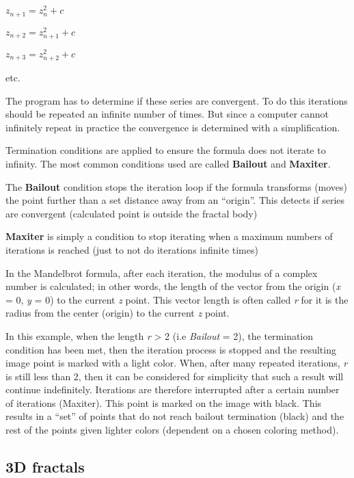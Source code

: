 \begin{center}
\(z_{n + 1} = z_{n}^{2} + c\)

\(z_{n + 2} = z_{n + 1}^{2} + c\)

\(z_{n + 3} = z_{n + 2}^{2} + c\)

etc.
\end{center}

The program has to determine if these series are convergent. To do this
iterations should be repeated an infinite number of times. But since a computer cannot
infinitely repeat in practice the convergence is determined with a simplification.

Termination conditions are applied to ensure the formula does not iterate to
infinity. The most common conditions used are called \textbf{Bailout} and
\textbf{Maxiter}.

\label{bailout-maxiter}The \textbf{Bailout} condition stops the iteration loop if the formula
transforms (moves) the point further than a set distance away from an
``origin''. This detects if series are convergent (calculated point is outside
the fractal body)

\textbf{Maxiter} is simply a condition to stop iterating when a maximum numbers
of iterations is reached (just to not do iterations infinite times)

In the Mandelbrot formula, after each iteration, the modulus of a complex number
is calculated; in other words, the length of the vector from the origin
(\emph{x} = 0, \emph{y} = 0) to the current \emph{z} point. This vector length
is often called \emph{r} for it is the radius from the center (origin) to the
current \emph{z} point.

In this example, when the length \emph{r} \textgreater{} 2 (i.e \emph{Bailout} =
2), the termination condition has been met, then the iteration process is
stopped and the resulting image point is marked with a light color. When, after
many repeated iterations, \emph{r} is still less than 2, then it can be
considered for simplicity that such a result will continue indefinitely.
Iterations are therefore interrupted after a certain number of iterations
(Maxiter). This point is marked on the image with black. This results in a
``set'' of points that do not reach bailout termination (black) and the rest of
the points given lighter colors (dependent on a chosen coloring method).

\subsection{3D fractals}\label{d-fractals}

